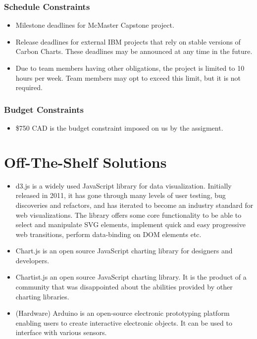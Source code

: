 \documentclass[12pt, titlepage]{article}
\begin{document}
\subsubsection{Schedule Constraints}
\begin{itemize}
    \item Milestone deadlines for McMaster Capstone project.
    \item Release deadlines for external IBM projects that rely on stable versions of Carbon Charts. These deadlines may be announced at any time in the future.
    \item Due to team members having other obligations, the project is limited to 10 hours per week. Team members may opt to exceed this limit, but it is not required.
\end{itemize}

\subsubsection{Budget Constraints}
\begin{itemize}
    \item \$750 CAD is the budget constraint imposed on us by the assigment.
\end{itemize}

\section{Off-The-Shelf Solutions}
\begin{itemize}
    \item d3.js is a widely used JavaScript library for data visualization. Initially released in 2011, it has gone through many levels of user testing, bug discoveries and refactors, and has iterated to become an industry standard for web visualizations. The library offers some core functionality to be able to select and manipulate SVG elements, implement quick and easy progressive web transitions, perform data-binding on DOM elements etc.
    \item Chart.js is an open source JavaScript charting library for designers and developers.
    \item Chartist.js an open source JavaScript charting library. It is the product of a community that was disappointed about the abilities provided by other charting libraries.
    \item (Hardware) Arduino is an open-source electronic prototyping platform enabling users to create interactive electronic objects. It can be used to interface with various sensors.
\end{itemize}
\end{document}
